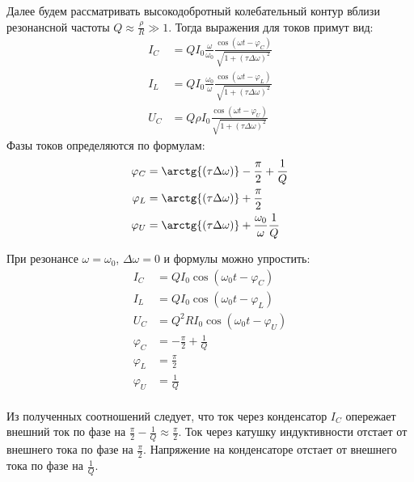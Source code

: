 Далее будем рассматривать высокодобротный колебательный контур вблизи резонансной частоты $Q \approx \frac{\rho}{R} \gg 1$. Тогда выражения для токов примут вид:
\begin{equation*}
	\begin{split}
		I_C &= Q I_0 \frac{\omega}{\omega_0} \frac{ \cos \left( \omega t - \varphi_C \right) }{ \sqrt{1 + (\tau \Delta \omega)^2} } \\
		I_L &= Q I_0 \frac{\omega_0}{\omega} \frac{ \cos \left( \omega t - \varphi_L \right) }{ \sqrt{1 + (\tau \Delta \omega)^2} } \\
		U_C &= Q \rho I_0 \frac{ \cos \left( \omega t - \varphi_U \right) }{ \sqrt{1 + (\tau \Delta \omega)^2} }		
	\end{split}
\end{equation*}
Фазы токов определяются по формулам:
\begin{equation*}
	\begin{split}
		\varphi_C &= \arctg{\left(\tau \Delta \omega\right)} - \frac{\pi}{2} + \frac{1}{Q} \\
		\varphi_L &= \arctg{\left(\tau \Delta \omega\right)} + \frac{\pi}{2} \\
		\varphi_U &= \arctg{\left(\tau \Delta \omega\right)} + \frac{\omega_0}{\omega} \frac{1}{Q} \\
	\end{split}
\end{equation*}

При резонансе $\omega = \omega_0$, $\Delta \omega = 0$ и формулы можно упростить:
\begin{equation*}
	\begin{split}
		I_C &= Q I_0 \cos \left( \omega_0 t - \varphi_C \right) \\
		I_L &= Q I_0 \cos \left( \omega_0 t - \varphi_L \right) \\
		U_C &= Q^2 R I_0 \cos \left( \omega_0 t - \varphi_U \right) \\		
		\varphi_C &= -\frac{\pi}{2} + \frac{1}{Q} \\
		\varphi_L &= \frac{\pi}{2} \\
		\varphi_U &= \frac{1}{Q} \\
	\end{split}
\end{equation*}

Из полученных соотношений следует, что ток через конденсатор $I_C$ опережает внешний ток по фазе на $\frac{\pi}{2} - \frac{1}{Q} \approx \frac{\pi}{2}$. Ток через катушку индуктивности отстает от внешнего тока по фазе на $\frac{\pi}{2}$. Напряжение на конденсаторе отстает от внешнего тока по фазе на $\frac{1}{Q}$.

